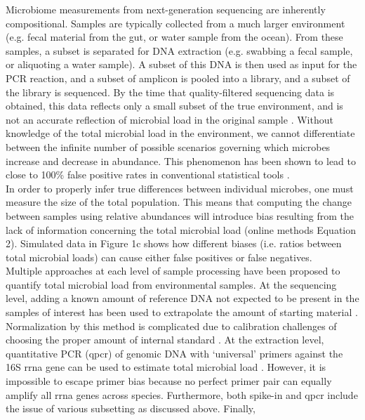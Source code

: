 %
%
Microbiome measurements from next-generation sequencing are inherently compositional. Samples are
typically collected from a much larger environment (e.g. fecal material from the gut, or water
sample from the ocean).  From these samples, a subset is separated for DNA extraction (e.g. swabbing
a fecal sample, or aliquoting a water sample). A subset of this DNA is then used as input for the PCR
reaction, and a subset of amplicon is pooled into a library, and a subset of the library is sequenced.
By the time that quality-filtered sequencing data is obtained, this data reflects only a small subset
of the true environment, and is not an accurate reflection of microbial load in the original sample
\cite{Vandeputte2017-jl}. Without knowledge of the total microbial load in the environment, we cannot
differentiate between the infinite number of possible scenarios governing which microbes increase and
decrease in abundance. This phenomenon has been shown to lead to close to 100\% false positive rates
in conventional statistical tools \cite{Mandal2015-xw,Morton2017-dz}.  \\[5 mm]
%
In order to properly infer true differences between individual microbes, one must measure the size of
the total population. This means that computing the change between samples using relative abundances
will introduce bias resulting from the lack of information concerning the total microbial load (online
methods Equation 2). Simulated data in Figure 1c shows how different biases (i.e. ratios between total
microbial loads) can cause either false positives or false negatives. \\[5 mm]
%
Multiple approaches at each level of sample processing have been proposed to quantify total microbial
load from environmental samples. At the sequencing level, adding a known amount of reference DNA not
expected to be present in the samples of interest has been used to extrapolate the amount of starting
material \cite{Smets2015-od, Tkacz2018-fp}.  Normalization by this method is complicated due to
calibration challenges of choosing the proper amount of internal standard \cite{Tkacz2018-fp,Smets2015-od}.
At the extraction level, quantitative PCR (\gls{qpcr}) of genomic DNA with ‘universal’ primers against the 16S
\gls{rrna} gene can be used to estimate total microbial load \cite{Nadkarni2002-og}. However, it is impossible
to escape primer bias because no perfect primer pair can equally amplify all \gls{rrna} genes across species.
Furthermore, both spike-in and \gls{qpcr} include the issue of various subsetting as discussed above. Finally,
